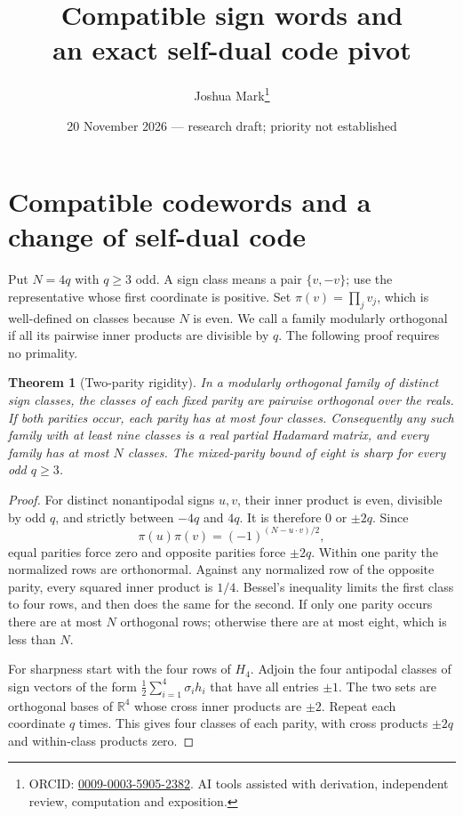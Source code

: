 \documentclass[11pt]{article}
\title{Compatible sign words and\\an exact self-dual code pivot}
\author{Joshua Mark\thanks{ORCID: \href{https://orcid.org/0009-0003-5905-2382}{0009-0003-5905-2382}. AI tools assisted with derivation, independent review, computation and exposition.}}
\date{20 November 2026 --- research draft; priority not established}
\newtheorem{theorem}{Theorem}[section]
\begin{document}
\maketitle
\section{Compatible codewords and a change of self-dual code}
\label{sec:compatible-codes}

Put $N=4q$ with $q\ge3$ odd. A sign class means a pair $\{v,-v\}$;
use the representative whose first coordinate is positive. Set
$\pi(v)=\prod_jv_j$, which is well-defined on classes because $N$ is even.
We call a family modularly orthogonal if all its pairwise inner products
are divisible by $q$. The following proof requires no primality.

\begin{theorem}[Two-parity rigidity]\label{code:parity}
In a modularly orthogonal family of distinct sign classes, the
classes of each fixed parity are pairwise orthogonal over the reals.
If both parities occur, each parity has at most four classes.
Consequently any such family with at least nine classes is a real
partial Hadamard matrix, and every family has at most $N$ classes.
The mixed-parity bound of eight is sharp for every odd $q\ge3$.
\end{theorem}
\begin{proof}
For distinct nonantipodal signs $u,v$, their inner product is even,
divisible by odd $q$, and strictly between $-4q$ and $4q$. It is
therefore $0$ or $\pm2q$. Since
\[
 \pi(u)\pi(v)=(-1)^{(N-u\cdot v)/2},
\]
equal parities force zero and opposite parities force $\pm2q$.
Within one parity the normalized rows are orthonormal. Against
any normalized row of the opposite parity, every squared inner
product is $1/4$. Bessel's inequality limits the first class to
four rows, and then does the same for the second.
If only one parity occurs there are at most $N$ orthogonal rows;
otherwise there are at most eight, which is less than $N$.

For sharpness start with the four rows of $H_4$. Adjoin the four
antipodal classes of sign vectors of the form
$\frac12\sum_{i=1}^4\sigma_i h_i$ that have all entries $\pm1$.
The two sets are orthogonal bases of $\mathbb R^4$ whose cross
inner products are $\pm2$. Repeat each coordinate $q$ times.
This gives four classes of each parity, with cross products
$\pm2q$ and within-class products zero.
\end{proof}
\end{document}

